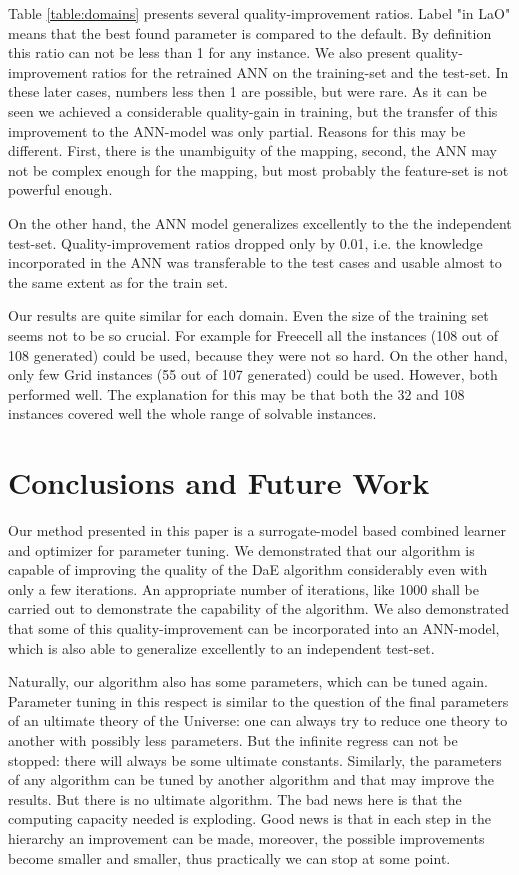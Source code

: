\documentclass{MYsig-alternate}
\begin{document}
Table \ref{table:domains} presents several quality-improvement ratios. Label "in LaO" means that the best found parameter is compared to the default. By definition this ratio can not be less than 1 for any instance. We also present quality-improvement ratios for the retrained ANN on the training-set and the test-set. In these later cases, numbers less then 1 are possible, but were rare. As it can be seen we achieved a considerable quality-gain in training, but the transfer of this improvement to the ANN-model was only partial. Reasons for this may be different. First, there is the unambiguity of the mapping, second, the ANN may not be complex enough for the mapping, but most probably the feature-set is not powerful enough. 

On the other hand, the ANN model generalizes excellently to the the independent test-set. Quality-improvement ratios dropped only by 0.01, i.e. the knowledge incorporated in the ANN was transferable to the test cases and usable almost to the same extent as for the train set.

Our results are quite similar for each domain. Even the size of the training set seems not to be so crucial. For example for Freecell all the instances (108 out of 108 generated) could be used, because they were not so hard. On the other hand, only few  Grid instances (55 out of 107 generated) could be used. However, both performed well. The explanation for this may be that both the 32 and 108 instances covered well the whole range of solvable instances.

\section{Conclusions and Future Work}
\label{section:conclusions}
\label{section:futurework}	

Our method presented in this paper is a surrogate-model based combined learner and optimizer for parameter tuning. We demonstrated that our algorithm is capable of improving the quality of the DaE algorithm considerably even with only a few iterations. An appropriate number of iterations, like 1000 shall be carried out to demonstrate the capability of the algorithm. We also demonstrated that some of this quality-improvement can be incorporated into an ANN-model, which is also able to generalize excellently to an independent test-set.

Naturally, our algorithm also has some parameters, which can be tuned again. Parameter tuning in this respect is similar to the question of the final parameters of an ultimate theory of the Universe: one can always try to reduce one theory to another with possibly less parameters. But the infinite regress can not be stopped: there will always be some ultimate constants. Similarly, the parameters of any algorithm can be tuned by another algorithm and that may improve the results. But there is no ultimate algorithm. The bad news here is that the computing capacity needed is exploding. Good news is that in each step in the hierarchy an improvement can be made, moreover, the possible improvements become smaller and smaller, thus practically we can stop at some point. 
\end{document}
